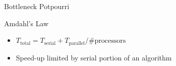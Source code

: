 \begin{frame}{Bottleneck Potpourri}
  \begin{block}{Amdahl's Law}
   \begin{itemize}
    \item $T_{\mathrm{total}} = T_{\mathrm{serial}} + T_{\mathrm{parallel}} / {\#\mathrm{processors}}$
    \item Speed-up limited by serial portion of an algorithm
   \end{itemize}
  \end{block}
  

\end{frame}